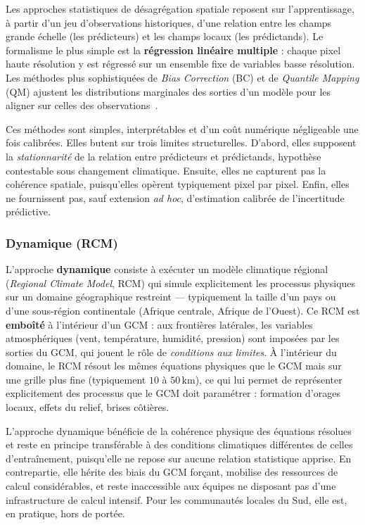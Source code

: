 \documentclass[14pt,a4paper,openany]{extreport}
\theoremstyle{definition}
\begin{document}
Les approches statistiques de désagrégation spatiale reposent sur l'apprentissage, à partir d'un jeu d'observations historiques, d'une relation entre les champs grande échelle (les prédicteurs) et les champs locaux (les prédictands). Le formalisme le plus simple est la \textbf{régression linéaire multiple} : chaque pixel haute résolution y est régressé sur un ensemble fixe de variables basse résolution. Les méthodes plus sophistiquées de \emph{Bias Correction} (BC) et de \emph{Quantile Mapping} (QM) ajustent les distributions marginales des sorties d'un modèle pour les aligner sur celles des observations~\cite{wilby_wigley_1997,maraun_widmann_2018}.

Ces méthodes sont simples, interprétables et d'un coût numérique négligeable une fois calibrées. Elles butent sur trois limites structurelles. D'abord, elles supposent la \emph{stationnarité} de la relation entre prédicteurs et prédictands, hypothèse contestable sous changement climatique. Ensuite, elles ne capturent pas la cohérence spatiale, puisqu'elles opèrent typiquement pixel par pixel. Enfin, elles ne fournissent pas, sauf extension \emph{ad hoc}, d'estimation calibrée de l'incertitude prédictive.

\subsubsection{Dynamique (RCM)}

L'approche \textbf{dynamique} consiste à exécuter un modèle climatique régional (\emph{Regional Climate Model}, RCM) qui simule explicitement les processus physiques sur un domaine géographique restreint --- typiquement la taille d'un pays ou d'une sous-région continentale (Afrique centrale, Afrique de l'Ouest). Ce RCM est \textbf{emboîté} à l'intérieur d'un GCM : aux frontières latérales, les variables atmosphériques (vent, température, humidité, pression) sont imposées par les sorties du GCM, qui jouent le rôle de \emph{conditions aux limites}. À l'intérieur du domaine, le RCM résout les mêmes équations physiques que le GCM mais sur une grille plus fine (typiquement $10$ à $50\,\mathrm{km}$), ce qui lui permet de représenter explicitement des processus que le GCM doit paramétrer : formation d'orages locaux, effets du relief, brises côtières.

L'approche dynamique bénéficie de la cohérence physique des équations résolues et reste en principe transférable à des conditions climatiques différentes de celles d'entraînement, puisqu'elle ne repose sur aucune relation statistique apprise. En contrepartie, elle hérite des biais du GCM forçant, mobilise des ressources de calcul considérables, et reste inaccessible aux équipes ne disposant pas d'une infrastructure de calcul intensif. Pour les communautés locales du Sud, elle est, en pratique, hors de portée.
\end{document}

